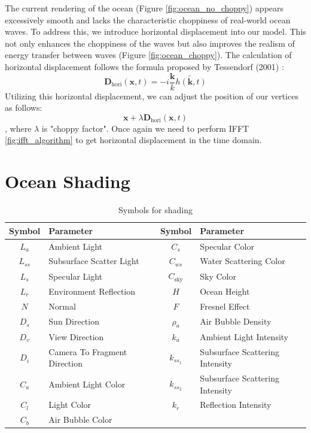 The current rendering of the ocean (Figure \ref{fig:ocean_no_choppy}) appears excessively smooth and lacks the characteristic choppiness of real-world ocean waves. To address this, we introduce horizontal displacement into our model. This not only enhances the choppiness of the waves but also improves the realism of energy transfer between waves (Figure \ref{fig:ocean_choppy}).
The calculation of horizontal displacement follows the formula proposed by Tessendorf (2001) \cite{tessendorf2001}:
\begin{equation}
    \mathbf{D}_{\text{hori}}(\textbf{x}, t) = -i\frac{\mathbf{k}}{k}\tilde{h(\mathbf{k}, t)}
\end{equation}
Utilizing this horizontal displacement, we can adjust the position of our vertices as follows:
\begin{equation}
    \mathbf{x} + \lambda \mathbf{D}_{\text{hori}}(\textbf{x}, t)
\end{equation}
, where $\lambda$ is "choppy factor".
Once again we need to perform IFFT \ref{fig:ifft_algorithm} to get horizontal displacement in the time domain.

\section{Ocean Shading}

\begin{table}[H]
    \centering
    \begin{tabular}{cl|cl}
        \toprule
        \textbf{Symbol} & \textbf{Parameter} & \textbf{Symbol} & \textbf{Parameter} \\
        \midrule
        $L_a$ & Ambient Light & $C_{s}$ & Specular Color \\
        $L_{ss}$ & Subsurface Scatter Light & $C_{ws}$ & Water Scattering Color \\
        $L_s$ & Specular Light & $C_{\text{sky}}$ & Sky Color \\
        $L_r$ & Environment Reflection & $H$ & Ocean Height \\
        $N$ & Normal & $F$ & Fresnel Effect \\
        $D_s$ & Sun Direction & $\rho_a$ & Air Bubble Density \\
        $D_v$ & View Direction & $k_a$ & Ambient Light Intensity \\
        $D_i$ & Camera To Fragment Direction & $k_{ss_1}$ & Subsurface Scattering Intensity \\
        $C_a$ & Ambient Light Color & $k_{ss_2}$ & Subsurface Scattering Intensity \\
        $C_l$ & Light Color & $k_{r}$ & Reflection Intensity \\
        $C_b$ & Air Bubble Color & & \\
        \bottomrule
    \end{tabular}
    \caption{Symbols for shading}
    \label{table:lighting_parameters}
\end{table}


